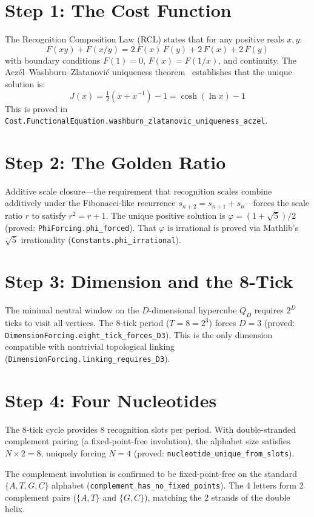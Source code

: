 \documentclass[11pt,twocolumn]{article}
\newcommand{\vp}{\varphi}
\newcommand{\lean}[1]{\texttt{#1}}
\begin{document}
\section{Step 1: The Cost Function}

The Recognition Composition Law (RCL) states that for any positive reals
$x, y$:
\[
F(xy) + F(x/y) = 2\,F(x)\,F(y) + 2\,F(x) + 2\,F(y)
\]
with boundary conditions $F(1) = 0$, $F(x) = F(1/x)$, and continuity.
The Acz\'el--Washburn--Zlatanovi\'c uniqueness theorem~\cite{Aczel1966}
establishes that the unique solution is:
\[
J(x) = \tfrac{1}{2}(x + x^{-1}) - 1 = \cosh(\ln x) - 1
\]
This is proved in \lean{Cost.FunctionalEquation.washburn\_zlatanovic\-\_uniqueness\_aczel}.

\section{Step 2: The Golden Ratio}

Additive scale closure---the requirement that recognition scales combine
additively under the Fibonacci-like recurrence $s_{n+2} = s_{n+1} + s_n$---forces
the scale ratio $r$ to satisfy $r^2 = r + 1$. The unique positive solution
is $\vp = (1 + \sqrt{5})/2$ (proved: \lean{PhiForcing.phi\_forced}).
That $\vp$ is irrational is proved via Mathlib's $\sqrt{5}$ irrationality
(\lean{Constants.phi\_irrational}).

\section{Step 3: Dimension and the 8-Tick}

The minimal neutral window on the $D$-dimensional hypercube $Q_D$ requires
$2^D$ ticks to visit all vertices. The 8-tick period ($T = 8 = 2^3$) forces
$D = 3$ (proved: \lean{DimensionForcing.eight\_tick\_forces\_D3}).
This is the only dimension compatible with nontrivial topological linking
(\lean{DimensionForcing.linking\_requires\_D3}).

\section{Step 4: Four Nucleotides}

The 8-tick cycle provides 8 recognition slots per period. With
double-stranded complement pairing (a fixed-point-free involution), the
alphabet size satisfies $N \times 2 = 8$, uniquely forcing $N = 4$
(proved: \lean{nucleotide\_unique\_from\_slots}).

The complement involution is confirmed to be fixed-point-free on the
standard $\{A, T, G, C\}$ alphabet (\lean{complement\_has\_no\_fixed\_points}).
The 4 letters form 2 complement pairs ($\{A, T\}$ and $\{G, C\}$),
matching the 2 strands of the double helix.
\end{document}
